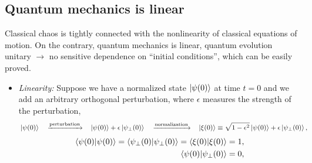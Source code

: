 \documentclass[a4paper,11pt,twoside]{article}
\begin{document}
    \subsection{Quantum mechanics is linear}
        Classical chaos is tightly connected with the nonlinearity of classical equations of motion.
        On the contrary, quantum mechanics is linear, quantum evolution unitary $\longrightarrow$ no sensitive dependence on ``initial conditions'', which can be easily proved.
        \begin{itemize}
            \item 
                \emph{Linearity:} Suppose we have a normalized state $\left|{\psi(0)}\right\rangle$ at time $t=0$ and we add an arbitrary orthogonal perturbation, where $\epsilon$ measures the strength of the perturbation,
                \begin{align}
                    &\left|{\psi(0)}\right\rangle
                    &&\xrightarrow{\text{perturbation}}
                    &&\left|{\psi(0)}\right\rangle+\epsilon\left|{\psi_{\perp}(0)}\right\rangle
                    &&\xrightarrow{\text{normalization}}
                    &&\left|{\xi(0)}\right\rangle\equiv\sqrt{1-\epsilon^{2}}\left|{\psi(0)}\right\rangle+\epsilon\left|{\psi_{\perp}(0)}\right\rangle,
                \end{align}
                \begin{align}
                    \left\langle{\psi(0)}\middle|{\psi(0)}\right\rangle=\left\langle{\psi_{\perp}(0)}\middle|{\psi_{\perp}(0)}\right\rangle=\left\langle{\xi(0)}\middle|{\xi(0)}\right\rangle=1,\nonumber\\
                    \label{eq:LinearityOrthogonality0}
                    \left\langle{\psi(0)}\middle|{\psi_{\perp}(0)}\right\rangle=0,                 
                \end{align}
            

\end{itemize}
\end{document}
